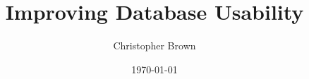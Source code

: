 \documentclass[twoside,abbrevs,bsc,logo,notimes]{styles/infthesis}
\title{Improving Database Usability}
\author{Christopher Brown}
\date{\today}
\begin{document}
  \begin{preliminary}
    \maketitle

    
    \standarddeclaration
    
    \tableofcontents
  \end{preliminary}

  
  
  
  
  
  

  \appendix


  
  
\end{document}
